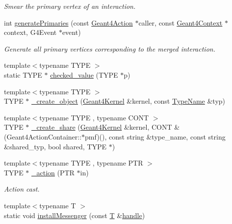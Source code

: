\begin{DoxyCompactItemize}
\begin{DoxyCompactList}\small\item\em Smear the primary vertex of an interaction. \end{DoxyCompactList}\item 
int \hyperlink{namespace_d_d4hep_1_1_simulation_af9101fceaeec2ab63e17c360a22638cd}{generate\+Primaries} (const \hyperlink{class_d_d4hep_1_1_simulation_1_1_geant4_action}{Geant4\+Action} $\ast$caller, const \hyperlink{class_d_d4hep_1_1_simulation_1_1_geant4_context}{Geant4\+Context} $\ast$context, G4\+Event $\ast$event)
\begin{DoxyCompactList}\small\item\em Generate all primary vertices corresponding to the merged interaction. \end{DoxyCompactList}\item 
{\footnotesize template$<$typename T\+Y\+PE $>$ }\\static T\+Y\+PE $\ast$ \hyperlink{namespace_d_d4hep_1_1_simulation_a4ac1b304fa5fccd459ed303474641342}{checked\+\_\+value} (T\+Y\+PE $\ast$p)
\item 
{\footnotesize template$<$typename T\+Y\+PE $>$ }\\T\+Y\+PE $\ast$ \hyperlink{namespace_d_d4hep_1_1_simulation_ada295bc8061b944b5583f4745bbe48cb}{\+\_\+create\+\_\+object} (\hyperlink{class_d_d4hep_1_1_simulation_1_1_geant4_kernel}{Geant4\+Kernel} \&kernel, const \hyperlink{class_d_d4hep_1_1_simulation_1_1_type_name}{Type\+Name} \&typ)
\item 
{\footnotesize template$<$typename T\+Y\+PE , typename C\+O\+NT $>$ }\\T\+Y\+PE $\ast$ \hyperlink{namespace_d_d4hep_1_1_simulation_a9e5ceb82c385d92f0623b96ed789b01a}{\+\_\+create\+\_\+share} (\hyperlink{class_d_d4hep_1_1_simulation_1_1_geant4_kernel}{Geant4\+Kernel} \&kernel, C\+O\+NT \&(Geant4\+Action\+Container\+::$\ast$pmf)(), const string \&type\+\_\+name, const string \&shared\+\_\+typ, bool shared, T\+Y\+PE $\ast$)
\item 
{\footnotesize template$<$typename T\+Y\+PE , typename P\+TR $>$ }\\T\+Y\+PE $\ast$ \hyperlink{namespace_d_d4hep_1_1_simulation_a661407c06cbbcc4896e2f6a83760c468}{\+\_\+action} (P\+TR $\ast$in)
\begin{DoxyCompactList}\small\item\em Action cast. \end{DoxyCompactList}\item 
{\footnotesize template$<$typename T $>$ }\\static void \hyperlink{namespace_d_d4hep_1_1_simulation_a258276959a44f54280ac69b5a6b74207}{install\+Messenger} (const \hyperlink{class_t}{T} \&\hyperlink{_geant4_converter_8cpp_a3789cd8800e1433fb917a1d6f85ef67d}{handle})

\end{DoxyCompactItemize}
